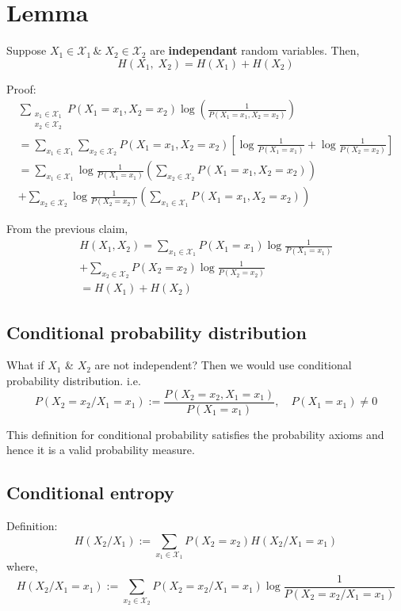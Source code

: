 \documentclass{article}
\begin{document}
\section{Lemma}

Suppose $X_1 \in \mathcal{X}_1\, \&\; X_2 \in \mathcal{X}_2$ are \textbf{independant} random variables. Then,
$$ H(X_1,\;X_2)=H(X_1)+H(X_2)$$

Proof:
\begin{gather*}
    \sum_{ \substack{x_1 \in \mathcal{X}_1 \\ x_2 \in \mathcal{X}_2}} P(X_1=x_1,X_2=x_2) \log \left( \frac{1}{P(X_1=x_1,X_2=x_2)} \right) \\
    = \sum_{x_1 \in \mathcal{X}_1 }\sum_{x_2 \in \mathcal{X}_2} P(X_1=x_1,X_2=x_2) \left[  \log \frac{1}{P(X_1=x_1)} + \log \frac{1}{P(X_2=x_2)}\right] \\
    = \sum_{x_1 \in \mathcal{X}_1 } \log \frac{1}{P(X_1=x_1)} \left( \sum_{x_2 \in \mathcal{X}_2} P(X_1=x_1,X_2=x_2)\right) \\
    + \sum_{x_2 \in \mathcal{X}_2 } \log \frac{1}{P(X_2=x_2)} \left( \sum_{x_1 \in \mathcal{X}_1} P(X_1=x_1,X_2=x_2)\right)
\end{gather*}

From the previous claim,
\begin{gather*}
    H(X_1,X_2)= \sum_{x_1 \in \mathcal{X}_1}P(X_1=x_1) \log \frac{1}{P(X_1=x_1)} \\
    + \sum_{x_2 \in \mathcal{X}_2}P(X_2=x_2) \log \frac{1}{P(X_2=x_2)} \\
    =H(X_1)+H(X_2)
\end{gather*}

\subsection{Conditional probability distribution}

What if $X_1$ \& $X_2$ are not independent? Then we would use conditional probability distribution. i.e.
$$ P(X_2=x_2/X_1=x_1):= \frac{P(X_2=x_2, X_1=x_1)}{P(X_1=x_1)}, \quad P(X_1=x_1) \neq 0 $$

This definition for conditional probability satisfies the probability axioms and hence it is a valid probability measure.

\subsection{Conditional entropy}
Definition:
$$ H(X_2/X_1):= \sum_{x_1 \in \mathcal{X}_1} P(X_2=x_2) H(X_2/X_1=x_1)$$
where,
$$ H(X_2/X_1=x_1):= \sum_{x_2 \in \mathcal{X}_2}P(X_2=x_2/X_1=x_1) \log \frac{1}{P(X_2=x_2/X_1=x_1)}$$
\end{document}
